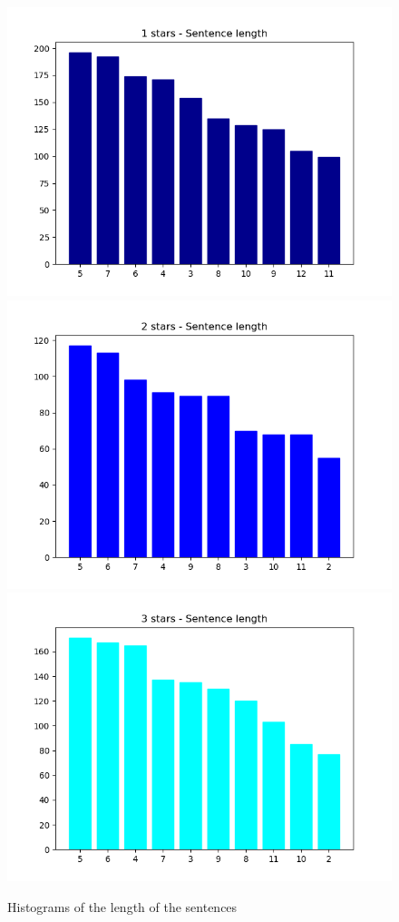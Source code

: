 \documentclass[sigchi]{acmart}
\begin{document}
	\begin{figure}
		\caption{Histograms of the length of the sentences}
		\includegraphics[scale=0.3]{figures/1stars-Sentencelength.png}
		\includegraphics[scale=0.3]{figures/2stars-Sentencelength.png}
		\includegraphics[scale=0.3]{figures/3stars-Sentencelength.png}

\end{figure}
\end{document}

